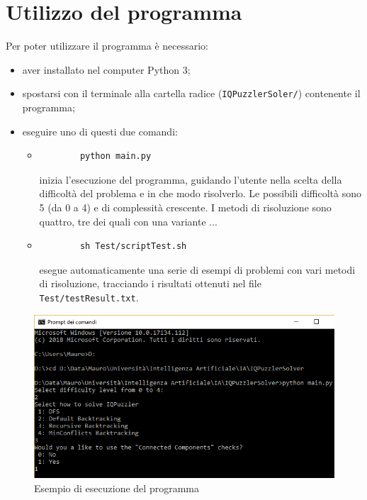 \section{Utilizzo del programma}
Per poter utilizzare il programma è necessario:
\begin{itemize}
	\item aver installato nel computer Python 3;
	\item spostarsi con il terminale alla cartella radice (\texttt{IQPuzzlerSoler/}) contenente il programma;
	\item eseguire uno di questi due comandi:
	\begin{itemize}
		\item \begin{verbatim}
		python main.py
		\end{verbatim}inizia l'esecuzione del programma, guidando l'utente nella scelta della difficoltà del problema e in che modo risolverlo. Le possibili difficoltà sono 5 (da 0 a 4) e di complessità crescente. I metodi di risoluzione sono quattro, tre dei quali con una variante ...
		\item \begin{verbatim}
		sh Test/scriptTest.sh
		\end{verbatim}esegue automaticamente una serie di esempi di problemi con vari metodi di risoluzione, tracciando i risultati ottenuti nel file \texttt{Test/testResult.txt}. 
	\end{itemize}
\end{itemize}
\begin{figure}[h]
	\centering
	\includegraphics[scale=0.65]{immagini/exe}
	\caption{Esempio di esecuzione del programma}
	\label{fig:exe}
\end{figure}


